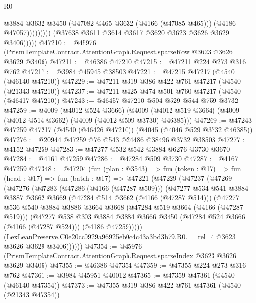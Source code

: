 \begin{lexlean}{R0}
\begin{coremodule}
                            @3884
                            @3632
                            @3450
                            (@47082 @465 @3632 (@4166 (@47085 @465)))
                            (@4186 @47057)))))))))
            (@37638 @3611 @3614 @3617 @3620 @3623 @3626 @3629 @3406)))))
@47210 := @45976 (PrismTemplateContract.AttentionGraph.Request.sparseRow @3623 @3626 @3629 @3406)
@47211 := @46386 @47210
@47215 := @47211 @224 @273 @316 @762
@47217 := @3984 @45945 @38503
@47221 := @47215 @47217 (@4540 (@46140 @47210))
@47229 := @47211 @319 @386 @422 @761 @47217 (@4540 (@21343 @47210))
@47237 := @47211 @425 @474 @501 @760 @47217 (@4540 (@46417 @47210))
@47243 := @46457 @47210 @504 @529 @544 @759 @3732
@47259 := @4009
    (@4012 @524 @3666)
    (@4009 (@4012 @519 @3664) (@4009 (@4012 @514 @3662) (@4009 (@4012 @509 @3730) @46385)))
@47269 := @47243 @47259 @47217 (@4540 (@46426 @47210)) (@4045 (@4046 @529 @3732 @46385))
@47276 := @20944 @47259 @76 @543 @24486 @38496 @3732 @38503
@47277 := @4152 @47259
@47283 := @47277 @532 @542 @3884 @6276 @3730 @3670
@47284 := @4161 @47259
@47286 := @47284 @509 @3730
@47287 := @4167 @47259
@47348 := @47204
    (fun (plan : @3543) =>
    fun (token : @17) =>
    fun (head : @17) =>
    fun (batch : @17) =>
    @47221
      (@47229
        (@47237
          (@47269
            (@47276
              (@47283
                (@47286 (@4166 (@47287 @509)))
                (@47277
                  @534
                  @541
                  @3884
                  @3887
                  @3662
                  @3669
                  (@47284 @514 @3662 (@4166 (@47287 @514)))
                  (@47277
                    @536
                    @540
                    @3884
                    @3886
                    @3664
                    @3668
                    (@47284 @519 @3664 (@4166 (@47287 @519)))
                    (@47277
                      @538
                      @303
                      @3884
                      @3884
                      @3666
                      @3450
                      (@47284 @524 @3666 (@4166 (@47287 @524)))
                      (@4186 @47259)))))
              (LexLeanPreserve.C0e20cc0929a96925eb0c4c43a3bd3b79.R0.__rel_4
                @3623
                @3626
                @3629
                @3406))))))
@47354 := @45976 (PrismTemplateContract.AttentionGraph.Request.sparseIndex @3623 @3626 @3629 @3406)
@47355 := @46386 @47354
@47359 := @47355 @224 @273 @316 @762
@47361 := @3984 @45951 @40012
@47365 := @47359 @47361 (@4540 (@46140 @47354))
@47373 := @47355 @319 @386 @422 @761 @47361 (@4540 (@21343 @47354))

\end{coremodule}
\end{lexlean}

